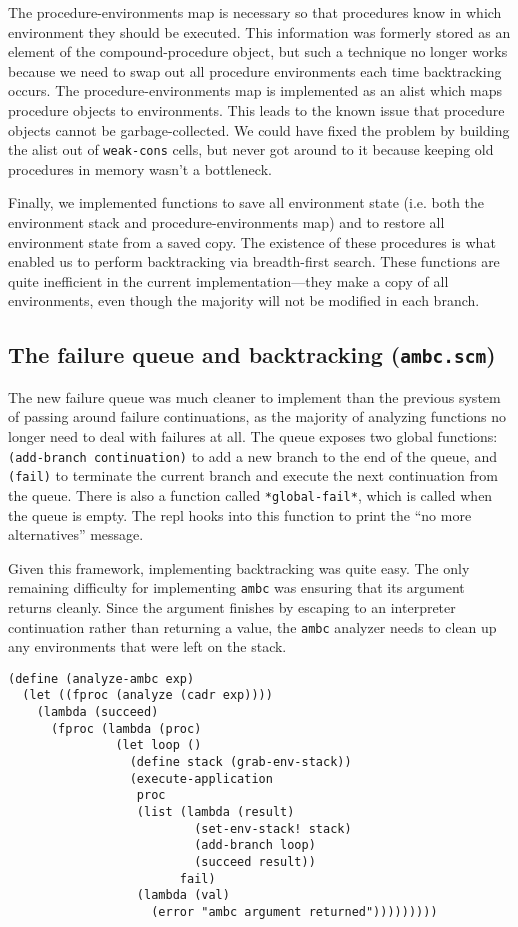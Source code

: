\documentclass{article}
\begin{document}
The procedure-environments map is necessary so that procedures know in
which environment they should be executed.  This information was
formerly stored as an element of the compound-procedure object, but
such a technique no longer works because we need to swap out all
procedure environments each time backtracking occurs.  The
procedure-environments map is implemented as an alist which maps
procedure objects to environments.  This leads to the known issue that
procedure objects cannot be garbage-collected. We could have fixed the
problem by building the alist out of \texttt{weak-cons} cells, but
never got around to it because keeping old procedures in memory wasn't
a bottleneck.

Finally, we implemented functions to save all environment state
(i.e. both the environment stack and procedure-environments map) and
to restore all environment state from a saved copy.  The existence of
these procedures is what enabled us to perform backtracking via
breadth-first search.  These functions are quite inefficient in the
current implementation---they make a copy of all environments, even
though the majority will not be modified in each branch.

\subsection{The failure queue and backtracking (\texttt{ambc.scm})}

The new failure queue was much cleaner to implement than the previous
system of passing around failure continuations, as the majority of
analyzing functions no longer need to deal with failures at all.  The
queue exposes two global functions: \texttt{(add-branch continuation)}
to add a new branch to the end of the queue, and \texttt{(fail)} to
terminate the current branch and execute the next continuation from
the queue.  There is also a function called \texttt{*global-fail*},
which is called when the queue is empty. The repl hooks into this
function to print the ``no more alternatives'' message.

Given this framework, implementing backtracking was quite easy.  The
only remaining difficulty for implementing \texttt{ambc} was ensuring
that its argument returns cleanly.  Since the argument finishes by
escaping to an interpreter continuation rather than returning a value,
the \texttt{ambc} analyzer needs to clean up any environments that
were left on the stack.

\begin{lstlisting}
(define (analyze-ambc exp)
  (let ((fproc (analyze (cadr exp))))
    (lambda (succeed)
      (fproc (lambda (proc)
               (let loop ()
                 (define stack (grab-env-stack))
                 (execute-application
                  proc
                  (list (lambda (result)
                          (set-env-stack! stack)
                          (add-branch loop)
                          (succeed result))
                        fail)
                  (lambda (val)
                    (error "ambc argument returned")))))))))
\end{lstlisting}
\end{document}
